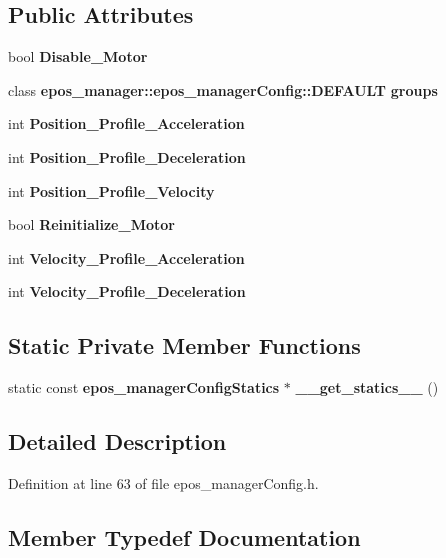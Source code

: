 \subsection*{\-Public \-Attributes}
\begin{DoxyCompactItemize}
\item 
bool {\bf \-Disable\-\_\-\-Motor}
\item 
class \*
{\bf epos\-\_\-manager\-::epos\-\_\-manager\-Config\-::\-D\-E\-F\-A\-U\-L\-T} {\bf groups}
\item 
int {\bf \-Position\-\_\-\-Profile\-\_\-\-Acceleration}
\item 
int {\bf \-Position\-\_\-\-Profile\-\_\-\-Deceleration}
\item 
int {\bf \-Position\-\_\-\-Profile\-\_\-\-Velocity}
\item 
bool {\bf \-Reinitialize\-\_\-\-Motor}
\item 
int {\bf \-Velocity\-\_\-\-Profile\-\_\-\-Acceleration}
\item 
int {\bf \-Velocity\-\_\-\-Profile\-\_\-\-Deceleration}
\end{DoxyCompactItemize}
\subsection*{\-Static \-Private \-Member \-Functions}
\begin{DoxyCompactItemize}
\item 
static const \*
{\bf epos\-\_\-manager\-Config\-Statics} $\ast$ {\bf \-\_\-\-\_\-get\-\_\-statics\-\_\-\-\_\-} ()
\end{DoxyCompactItemize}


\subsection{\-Detailed \-Description}


\-Definition at line 63 of file epos\-\_\-manager\-Config.\-h.



\subsection{\-Member \-Typedef \-Documentation}
